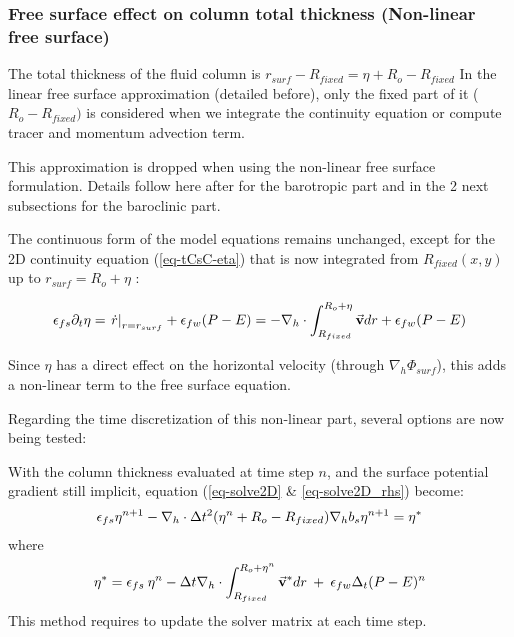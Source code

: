 \subsubsection{Free surface effect on column total thickness
(Non-linear free surface)}

The total thickness of the fluid column is
$r_{surf} - R_{fixed} = \eta + R_o - R_{fixed}$
In the linear free surface approximation
(detailed before), only the fixed part of
it ($R_o - R_{fixed})$ is considered when we integrate the 
continuity equation or compute tracer and momentum advection term.

This approximation is dropped when using 
the non-linear free surface formulation. 
Details follow here after for the barotropic part
and in the 2 next subsections for the baroclinic
part.


The continuous form of the model equations remains 
unchanged, except for the 2D continuity equation
(\ref{eq-tCsC-eta}) that is now integrated 
from $R_{fixed}(x,y)$ up to $r_{surf}=R_o+\eta$ :

\begin{displaymath}
\epsilon_{fs} \partial_t \eta =
\left. \dot{r} \right|_{r=r_{surf}} + \epsilon_{fw} (P-E) =
- {\bf \nabla}_h \cdot \int_{R_{fixed}}^{R_o+\eta} \vec{\bf v} dr
+ \epsilon_{fw} (P-E)
\end{displaymath}

Since $\eta$ has a direct effect on the horizontal
velocity (through $\nabla_h \Phi_{surf}$), this
adds a non-linear term to the free surface equation.

Regarding the time discretization of this non-linear part,
several options are now being tested:

With the column thickness evaluated at time step $n$,
and the surface potential gradient still implicit,
equation (\ref{eq-solve2D} \& \ref{eq-solve2D_rhs})
become:
\begin{eqnarray*}
\epsilon_{fs} {\eta}^{n+1} -
{\bf \nabla}_h \cdot \Delta t^2 (\eta^{n}+R_o-R_{fixed})
{\bf \nabla}_h b_s {\eta}^{n+1}
= {\eta}^*
\end{eqnarray*}
where
\begin{eqnarray*}
{\eta}^* = \epsilon_{fs} \: {\eta}^{n} -
\Delta t {\bf \nabla}_h \cdot \int_{R_{fixed}}^{R_o+\eta^n} \vec{\bf v}^* dr
\: + \: \epsilon_{fw} \Delta_t (P-E)^{n}
\end{eqnarray*} 
This method requires to update the solver matrix at each time step.

